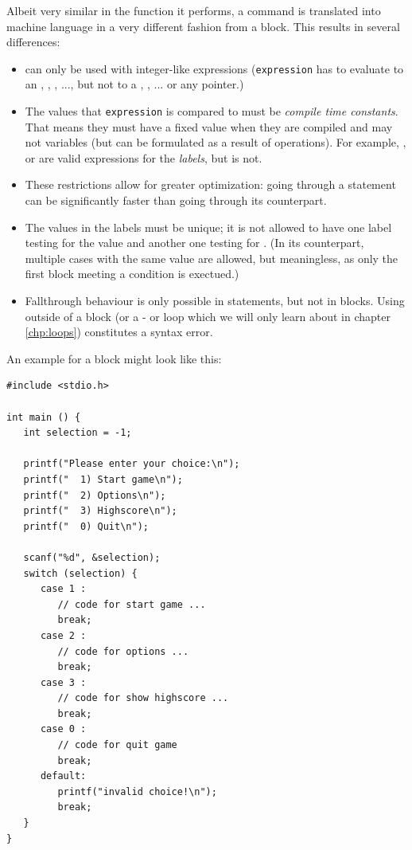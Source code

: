 Albeit very similar in the function it performs, a  command is translated into machine language in a very different fashion from a  block. This results in several differences:
\begin{itemize}
\item {} can only be used with integer-like expressions (\ie \texttt{expression} has to evaluate to an , , , ..., 
	but not to a , , ... or any pointer.)
\item The values that \texttt{expression} is compared to must be \emph{compile time constants}. That means they must have a fixed value when they are compiled and may not variables 
	(but can be formulated as a result of operations). For example, , or  are valid expressions for the  \emph{labels}, but  is not.
\item These restrictions allow for greater optimization: going through a  statement can be significantly faster than going through its  counterpart.
\item The values in the  labels must be unique; it is not allowed to have one label testing for the value  and another one testing for . 
	(In its  counterpart, multiple cases with the same value are allowed, but meaningless, as only the first block meeting a condition is exectued.)
\item Fallthrough behaviour is only possible in  statements, but not  in  blocks. Using  outside of a  block (or a - or  loop which we will only learn about in chapter \ref{chp:loops}) constitutes a syntax error.
\end{itemize}

An example for a  block might look like this:
\begin{codebox}[menu.c]
\begin{verbatim}
#include <stdio.h>

int main () {
   int selection = -1;

   printf("Please enter your choice:\n");
   printf("  1) Start game\n");
   printf("  2) Options\n");
   printf("  3) Highscore\n");
   printf("  0) Quit\n");

   scanf("%d", &selection);
   switch (selection) {
      case 1 :
         // code for start game ...
         break;
      case 2 :
         // code for options ...
         break;
      case 3 :
         // code for show highscore ...
         break;
      case 0 :
         // code for quit game
         break;
      default:
         printf("invalid choice!\n");
         break;
   }
}
\end{verbatim}
\end{codebox}

